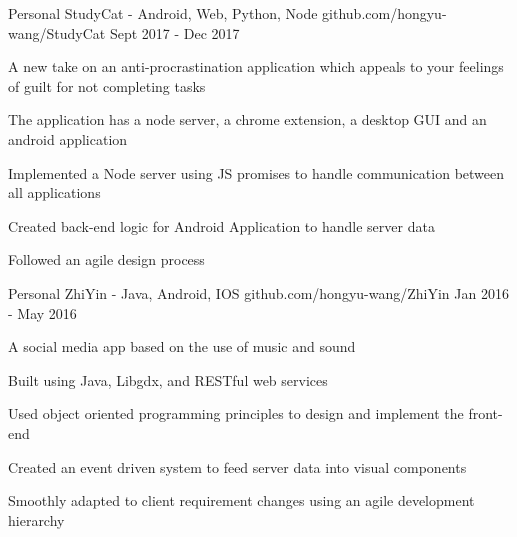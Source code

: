 

\begin{cventries}

\cventry
{Personal} %
{StudyCat - Android, Web, Python, Node} %
{github.com/hongyu-wang/StudyCat} %
{Sept 2017 - Dec 2017} %
{ %
	\begin{cvitems}
		\item {A new take on an anti-procrastination application which appeals to your feelings of guilt for not completing tasks}
		\item {The application has a node server, a chrome extension, a desktop GUI and an android application}
		\item {Implemented a Node server using JS promises to handle communication between all applications}
		\item {Created back-end logic for Android Application to handle server data}
		\item {Followed an agile design process}
	\end{cvitems}
}



\cventry
{Personal} %
{ZhiYin - Java, Android, IOS} %
{github.com/hongyu-wang/ZhiYin} %
{Jan 2016 - May 2016} %
{ %
\begin{cvitems}
\item {A social media app based on the use of music and sound}
\item { Built using Java, Libgdx, and RESTful web services}
\item { Used object oriented programming principles to design and implement the front-end }
\item {Created an event driven system to feed server data into visual components}
\item {Smoothly adapted to client requirement changes using an agile development hierarchy} %
\end{cvitems}
}





\end{cventries}